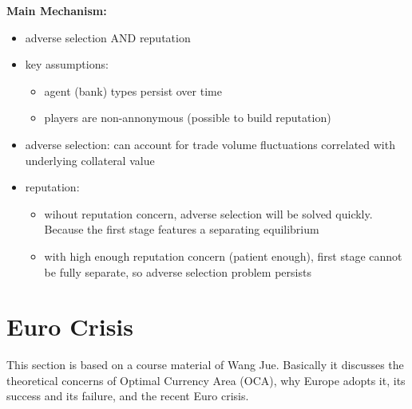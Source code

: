 \documentclass{book}
\theoremstyle{plain}
\theoremstyle{definition}
\begin{document}
 \noindent
 \textbf{Main Mechanism:}
 \begin{itemize}
 	\item adverse selection AND reputation
 	\item key assumptions:
 	\begin{itemize}
 		\item agent (bank) types persist over time
 		\item players are non-annonymous (possible to build reputation)
 	\end{itemize}
 	\item adverse selection: can account for trade volume fluctuations correlated with underlying collateral value
 	\item reputation:
 	\begin{itemize}
 		\item wihout reputation concern, adverse selection will be solved quickly. Because the first stage features a separating equilibrium
 		\item with high enough reputation concern (patient enough), first stage cannot be fully separate, so adverse selection problem persists
 	\end{itemize}
 \end{itemize}








\chapter{Euro Crisis} %
\label{cha:euro_crisis}

This section is based on a course material of Wang Jue. Basically it discusses the theoretical concerns of Optimal Currency Area (OCA), why Europe adopts it, its success and its failure, and the recent Euro crisis.\\

\textbf{}
\end{document}
